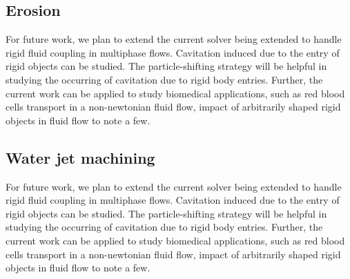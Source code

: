 \subsection{Erosion}
For future work, we plan to extend the current solver being extended to handle
rigid fluid coupling in multiphase flows. Cavitation induced due to the entry
of rigid objects can be studied. The particle-shifting strategy will be
helpful in studying the occurring of cavitation due to rigid body entries.
Further, the current work can be applied to study biomedical applications,
such as red blood cells transport in a non-newtonian fluid flow, impact of
arbitrarily shaped rigid objects in fluid flow to note a few.


\subsection{Water jet machining}
For future work, we plan to extend the current solver being extended to handle
rigid fluid coupling in multiphase flows. Cavitation induced due to the entry
of rigid objects can be studied. The particle-shifting strategy will be
helpful in studying the occurring of cavitation due to rigid body entries.
Further, the current work can be applied to study biomedical applications,
such as red blood cells transport in a non-newtonian fluid flow, impact of
arbitrarily shaped rigid objects in fluid flow to note a few.
